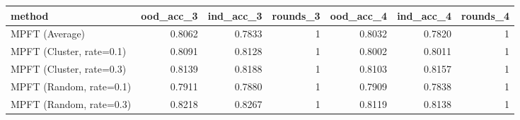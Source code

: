 \begin{tabular}{lrrrrrr}
\toprule
method & ood_acc_3 & ind_acc_3 & rounds_3 & ood_acc_4 & ind_acc_4 & rounds_4 \\
\midrule
MPFT (Average) & 0.8062 & 0.7833 & 1 & 0.8032 & 0.7820 & 1 \\
MPFT (Cluster, rate=0.1) & 0.8091 & 0.8128 & 1 & 0.8002 & 0.8011 & 1 \\
MPFT (Cluster, rate=0.3) & 0.8139 & 0.8188 & 1 & 0.8103 & 0.8157 & 1 \\
MPFT (Random, rate=0.1) & 0.7911 & 0.7880 & 1 & 0.7909 & 0.7838 & 1 \\
MPFT (Random, rate=0.3) & 0.8218 & 0.8267 & 1 & 0.8119 & 0.8138 & 1 \\
\bottomrule
\end{tabular}
